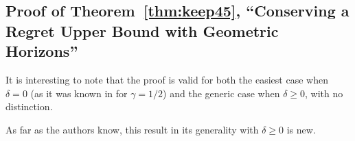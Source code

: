 \documentclass[12pt]{colt2018} %
\begin{document}


\subsection{Proof of Theorem~\ref{thm:keep45}, ``Conserving a Regret Upper Bound with Geometric Horizons''}\label{sub:proof_keep45}

It is interesting to note that
the proof is valid for both the easiest case when $\delta=0$ (as it was known in \cite{CesaLugosi06} for $\gamma=1/2$)
and the generic case when $\delta\geq0$,
with no distinction.

As far as the authors know, this result in its generality with $\delta\geq0$ is new.
\end{document}
